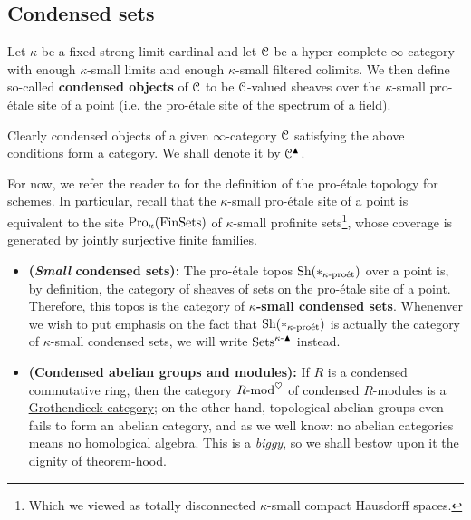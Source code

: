         \subsection{Condensed sets}
            \begin{definition} \label{def: condensed_objects}
                Let $\kappa$ be a fixed strong limit cardinal and let $\mathcal{C}$ be a hyper-complete $\infty$-category with enough $\kappa$-small limits and enough $\kappa$-small filtered colimits. We then define so-called \textbf{condensed objects} of $\mathcal{C}$ to be $\mathcal{C}$-valued sheaves over the $\kappa$-small pro-\'etale site of a point (i.e. the pro-\'etale site of the spectrum of a field). 
                
                Clearly condensed objects of a given $\infty$-category $\mathcal{C}$ satisfying the above conditions form a category. We shall denote it by $\mathcal{C}^{\blacktriangle}$.
            \end{definition}
            \begin{remark}
                For now, we refer the reader to \cite[Definition 4.1.1 and Remark 4.1.3]{bhatt_scholze_2014_pro_etale} for the definition of the pro-\'etale topology for schemes. In particular, recall that the $\kappa$-small pro-\'etale site of a point is equivalent to the site $\mathrm{Pro}_{\kappa}(\mathrm{Fin}\mathrm{Sets})$ of $\kappa$-small profinite sets\footnote{Which we viewed as totally disconnected $\kappa$-small compact Hausdorff spaces.}, whose coverage is generated by jointly surjective finite families. 
            \end{remark}
            \begin{example}
                \noindent
                \begin{itemize}
                    \item \textbf{(\textit{Small} condensed sets):} The pro-\'etale topos $\mathrm{Sh}(*_{\kappa\text{-}\mathrm{pro\acute{e}t}})$ over a point is, by definition, the category of sheaves of sets on the pro-\'etale site of a point. Therefore, this topos is the category of \textbf{$\kappa$-small condensed sets}. Whenenver we wish to put emphasis on the fact that $\mathrm{Sh}(*_{\kappa\text{-}\mathrm{pro\acute{e}t}})$ is actually the category of $\kappa$-small condensed sets, we will write $\mathrm{Sets}^{\kappa\text{-}\blacktriangle}$ instead.
                    \item \textbf{(Condensed abelian groups and modules):} If $R$ is a condensed commutative ring, then the category $R\text{-}\mathrm{mod}^{\heartsuit}$ of condensed $R$-modules is a \href{https://ncatlab.org/nlab/show/Grothendieck+category}{\underline{Grothendieck category}}; on the other hand, topological abelian groups even fails to form an abelian category, and as we well know: no abelian categories means no homological algebra. This is a \textit{biggy}, so we shall bestow upon it the dignity of theorem-hood.
                \end{itemize}
            \end{example}
